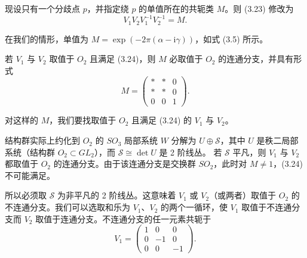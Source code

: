 现设只有一个分歧点 $p$，并指定绕 $p$ 的单值所在的共轭类 $M$。则 (3.23) 修改为
\begin{equation}\tag{3.24}
V_1V_2V_1^{-1}V_2^{-1}=M.
\end{equation}

在我们的情形，单值为 $M=\exp(-2\pi(\alpha-\mathrm{i}\gamma))$，如式 (3.5) 所示。

若 $V_1$ 与 $V_2$ 取值于 $O_2$ 且满足 (3.24)，则 $M$ 必取值于 $O_2$ 的连通分支，并具有形式
\begin{equation}\tag{3.25}
M=
\begin{pmatrix}
* & * & 0\\
* & * & 0\\
0 & 0 & 1
\end{pmatrix}.
\end{equation}

对这样的 $M$，我们要找取值于 $O_2$ 且满足 (3.24) 的 $V_1$ 与 $V_2$。

结构群实际上约化到 $O_2$ 的 $SO_3$ 局部系统 $W$ 分解为 $U\oplus\mathcal{S}$，其中 $U$ 是秩二局部系统（结构群 $O_2\subset GL_2$），而 $\mathcal{S}\cong\det U$ 是 2 阶线丛。
若 $\mathcal{S}$ 平凡，则 $V_1$ 与 $V_2$ 都取值于 $O_2$ 的连通分支。由于该连通分支是交换群 $SO_2$，此时对 $M\ne1$，(3.24) 不可能满足。

所以必须取 $\mathcal{S}$ 为非平凡的 2 阶线丛。这意味着 $V_1$ 或 $V_2$（或两者）取值于 $O_2$ 的不连通分支。我们可以选取和乐为 $V_1$、$V_2$ 的两个一循环，使 $V_1$ 取值于不连通分支而 $V_2$ 取值于连通分支。不连通分支的任一元素共轭于
\begin{equation}\tag{3.26}
V_1=
\begin{pmatrix}
1 & 0 & 0\\
0 & -1 & 0\\
0 & 0 & -1
\end{pmatrix}.
\end{equation}

